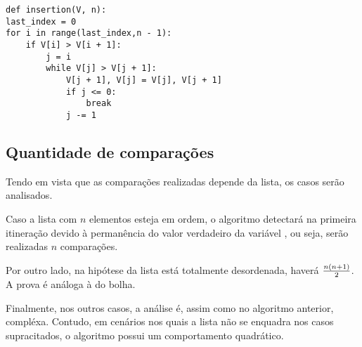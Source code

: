 \begin{lstlisting}
def insertion(V, n):
last_index = 0
for i in range(last_index,n - 1):
    if V[i] > V[i + 1]:
        j = i
        while V[j] > V[j + 1]:
            V[j + 1], V[j] = V[j], V[j + 1]
            if j <= 0:
                break
            j -= 1
\end{lstlisting}

\subsection*{Quantidade de comparações}
Tendo em vista que as comparações realizadas depende da lista, os casos serão analisados. 

Caso a lista com $n$ elementos esteja em ordem, o algoritmo detectará na primeira itineração devido à permanência do valor verdadeiro da variável , ou seja, serão realizadas $n$ comparações.

Por outro lado, na hipótese da lista está totalmente desordenada, haverá $n(n+1)\over 2$. A prova é análoga à do bolha.

Finalmente, nos outros casos, a análise é, assim como no algoritmo anterior, compléxa. Contudo, em cenários nos quais a lista não se enquadra nos casos supracitados, o algoritmo possui um comportamento quadrático.
